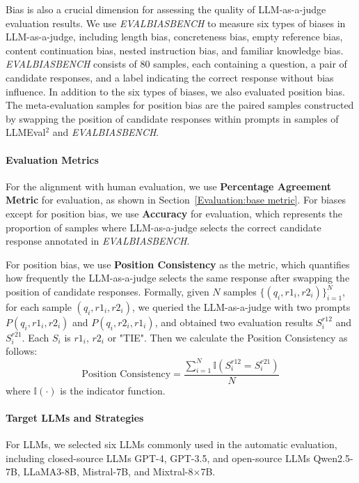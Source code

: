 \documentclass[acmsmall,screen]{acmart}
\begin{document}
Bias is also a crucial dimension for assessing the quality of LLM-as-a-judge evaluation results. We use \textit{EVALBIASBENCH}\citep{offsetbias} to measure six types of biases in LLM-as-a-judge, including length bias, concreteness bias, empty reference bias, content continuation bias, nested instruction bias, and familiar knowledge bias. \textit{EVALBIASBENCH} consists of 80 samples, each containing a question, a pair of candidate responses, and a label indicating the correct response without bias influence. In addition to the six types of biases, we also evaluated position bias. The meta-evaluation samples for position bias are the paired samples constructed by swapping the position of candidate responses within prompts in samples of LLMEval$^2$ and \textit{EVALBIASBENCH}.

\paragraph{\textbf{Evaluation Metrics}}
For the alignment with human evaluation, we use \textbf{Percentage Agreement Metric}\citep{thakur2024judging} for evaluation, as shown in Section~\ref{Evaluation:base metric}. For biases except for position bias, we use \textbf{Accuracy} for evaluation, which represents the proportion of samples where LLM-as-a-judge selects the correct candidate response annotated in \textit{EVALBIASBENCH}. 

For position bias, we use \textbf{Position Consistency} as the metric, which quantifies how frequently the LLM-as-a-judge selects the same response after swapping the position of candidate responses. Formally, given $N$ samples $\{(q_i,r1_i,r2_i)\}^N_{i=1}$, for each sample $(q_i,r1_i,r2_i)$, we queried the LLM-as-a-judge with two prompts $P(q_i,r1_i,r2_i)$ and $P(q_i,r2_i,r1_i)$, and obtained two evaluation results $S_i^{r12}$ and $S_i^{r21}$. Each $S_i$ is $r1_i$, $r2_i$ or "TIE". Then we calculate the Position Consistency as follows:
\begin{equation*}
    \text{Position Consistency}=\frac{\sum_{i=1}^N\mathbb{I}(S_i^{r12}=S_i^{r21})}{N}
\end{equation*}
where $\mathbb{I}(\cdot)$ is the indicator function.

\paragraph{\textbf{Target LLMs and Strategies}}
For LLMs, we selected six LLMs commonly used in the automatic evaluation, including closed-source LLMs GPT-4, GPT-3.5, and open-source LLMs Qwen2.5-7B, LLaMA3-8B, Mistral-7B, and Mixtral-8$\times$7B.
\end{document}
